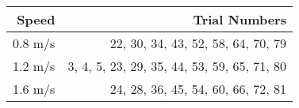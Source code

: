 \begin{tabular}{rr}
\toprule
Speed & Trial Numbers \\
\midrule
0.8 m/s & 22, 30, 34, 43, 52, 58, 64, 70, 79 \\
1.2 m/s & 3, 4, 5, 23, 29, 35, 44, 53, 59, 65, 71, 80 \\
1.6 m/s & 24, 28, 36, 45, 54, 60, 66, 72, 81 \\
\bottomrule
\end{tabular}